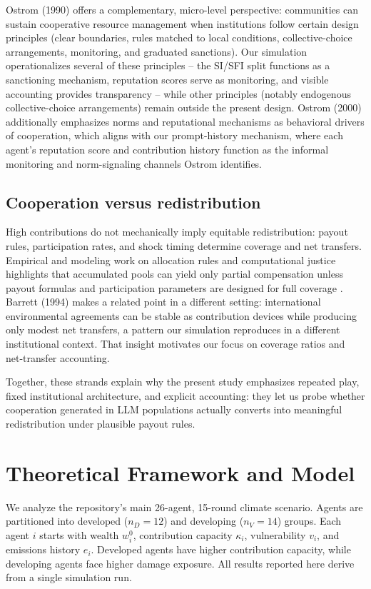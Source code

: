\documentclass[12pt,letterpaper]{report}
\begin{document}
Ostrom (1990) offers a complementary, micro-level perspective: communities can sustain cooperative resource management when institutions follow certain design principles (clear boundaries, rules matched to local conditions, collective-choice arrangements, monitoring, and graduated sanctions). Our simulation operationalizes several of these principles -- the SI/SFI split functions as a sanctioning mechanism, reputation scores serve as monitoring, and visible accounting provides transparency -- while other principles (notably endogenous collective-choice arrangements) remain outside the present design. Ostrom (2000) additionally emphasizes norms and reputational mechanisms as behavioral drivers of cooperation, which aligns with our prompt-history mechanism, where each agent's reputation score and contribution history function as the informal monitoring and norm-signaling channels Ostrom identifies.

\section{Cooperation versus redistribution}
High contributions do not mechanically imply equitable redistribution: payout rules, participation rates, and shock timing determine coverage and net transfers. Empirical and modeling work on allocation rules and computational justice highlights that accumulated pools can yield only partial compensation unless payout formulas and participation parameters are designed for full coverage \citep{ospina2025,piatti2024}. Barrett (1994) makes a related point in a different setting: international environmental agreements can be stable as contribution devices while producing only modest net transfers, a pattern our simulation reproduces in a different institutional context. That insight motivates our focus on coverage ratios and net-transfer accounting.

Together, these strands explain why the present study emphasizes repeated play, fixed institutional architecture, and explicit accounting: they let us probe whether cooperation generated in LLM populations actually converts into meaningful redistribution under plausible payout rules.

\chapter{Theoretical Framework and Model}

We analyze the repository's main 26-agent, 15-round climate scenario. Agents are partitioned into developed ($n_D=12$) and developing ($n_V=14$) groups. Each agent $i$ starts with wealth $w_i^0$, contribution capacity $\kappa_i$, vulnerability $v_i$, and emissions history $e_i$. Developed agents have higher contribution capacity, while developing agents face higher damage exposure. All results reported here derive from a single simulation run.
\end{document}
